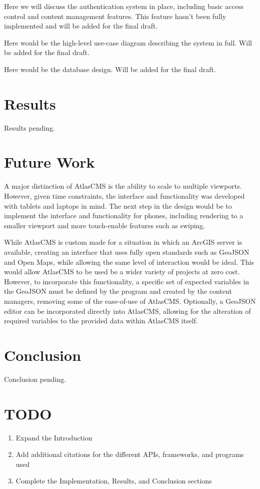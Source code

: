 \documentclass[11pt, draftcls, conference, onecolumn]{IEEEtran}
\begin{document}
Here we will discuss the authentication system in place, including basic access control and content management features. This feature hasn't been fully implemented and will be added for the final draft.

Here would be the high-level use-case diagram describing the system in full. Will be added for the final draft.

Here would be the database design. Will be added for the final draft.

\section{Results}
Results pending.

\section{Future Work}
A major distinction of AtlasCMS is the ability to scale to multiple viewports. However, given time constraints, the interface and functionality was developed with tablets and laptops in mind. The next step in the design would be to implement the interface and functionality for phones, including rendering to a smaller viewport and more touch-enable features such as swiping.

While AtlasCMS is custom made for a situation in which an ArcGIS server is available, creating an interface that uses fully open standards such as GeoJSON and Open Maps, while allowing the same level of interaction would be ideal. This would allow AtlasCMS to be used be a wider variety of projects at zero cost. However, to incorporate this functionality, a specific set of expected variables in the GeoJSON must be defined by the program and created by the content managers, removing some of the ease-of-use of AtlasCMS. Optionally, a GeoJSON editor can be incorporated directly into AtlasCMS, allowing for the alteration of required variables to the provided data within AtlasCMS itself.

\section{Conclusion}
Conclusion pending.

\section{TODO}

\begin{enumerate}
\item Expand the Introduction
\item Add additional citations for the different APIs, frameworks, and programs used
\item Complete the Implementation, Results, and Conclusion sections
\end{enumerate}



\end{document}
